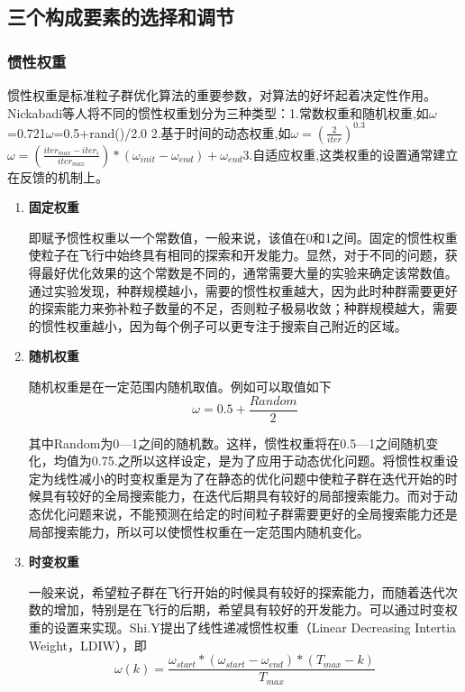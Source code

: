 \subsection{三个构成要素的选择和调节}
\subsubsection{惯性权重}
惯性权重是标准粒子群优化算法的重要参数，对算法的好坏起着决定性作用。Nickabadi等人将不同的惯性权重划分为三种类型\cite{Nickabadi2011A}：1.常数权重和随机权重,如\quad$\omega$=0.721\quad $\omega$=0.5+rand()/2.0
	\quad2.基于时间的动态权重,如\quad$\omega={(\frac{2}{iter})}^{0.3}$\quad$\omega=(\frac{{iter}_{max}-{iter}_i}{{iter}_{max}})*(\omega_{init}-\omega_{end})+\omega_{end}$\quad3.自适应权重\cite{Jianghong2006A},这类权重的设置通常建立在反馈的机制上。
\begin{enumerate}
	\item \textbf{固定权重}
	
	\hspace{2em} 即赋予惯性权重以一个常数值，一般来说，该值在0和1之间。固定的惯性权重使粒子在飞行中始终具有相同的探索和开发能力。显然，对于不同的问题，获得最好优化效果的这个常数是不同的，通常需要大量的实验来确定该常数值。通过实验发现，种群规模越小，需要的惯性权重越大，因为此时种群需要更好的探索能力来弥补粒子数量的不足，否则粒子极易收敛；种群规模越大，需要的惯性权重越小，因为每个例子可以更专注于搜索自己附近的区域。
	\item \textbf{随机权重}
	
	\hspace{2em}随机权重是在一定范围内随机取值\cite{Zhao2013A}。例如可以取值如下
	\begin{equation}
	\omega=0.5+\frac{Random}{2}
	\end{equation}
	
	其中Random为0—1之间的随机数。这样，惯性权重将在0.5—1之间随机变化，均值为0.75.之所以这样设定，是为了应用于动态优化问题。将惯性权重设定为线性减小的时变权重是为了在静态的优化问题中使粒子群在迭代开始的时候具有较好的全局搜索能力，在迭代后期具有较好的局部搜索能力。而对于动态优化问题来说，不能预测在给定的时间粒子群需要更好的全局搜索能力还是局部搜索能力，所以可以使惯性权重在一定范围内随机变化。
	\item \textbf{时变权重}
	
	\hspace{2em}一般来说，希望粒子群在飞行开始的时候具有较好的探索能力，而随着迭代次数的增加，特别是在飞行的后期，希望具有较好的开发能力。可以通过时变权重的设置来实现。Shi.Y提出了线性递减惯性权重（Linear Decreasing Intertia Weight，LDIW）\cite{Xin2009A}，即
	\begin{equation}
	\omega(k)=\frac{\omega_{start}*(\omega_{start}-\omega_{end})*(T_{max}-k)}{T_{max}}
	\end{equation}
	

\end{enumerate}
